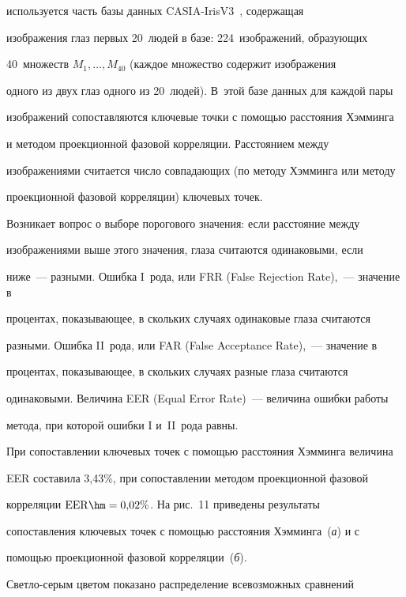 используется часть базы данных CASIA-IrisV3~\cite{12-pav}, содержащая 


изображения глаз первых 20~людей в базе: 224~изображений, образующих 


40~множеств $M_1,\ldots , M_{40}$ (каждое множество содержит изображения 


одного из двух глаз одного из 20~людей). В~этой базе данных для каждой пары 


изображений сопоставляются ключевые точки с помощью расстояния Хэмминга 


и методом проекционной фазовой корреляции. Расстоянием между 


изображениями считается число совпадающих (по методу Хэмминга или методу 


проекционной фазовой корреляции) ключевых точек.





Возникает вопрос о выборе порогового значения: если расстояние между 


изоб\-ра\-же\-ни\-ями выше этого значения, глаза считаются одинаковыми, если 


ниже~--- разными. Ошибка I~рода, или FRR (False Rejection Rate),~--- значение в 


процентах, показывающее, в скольких случаях одинаковые глаза считаются 


разными. Ошибка II~рода, или FAR (False Acceptance Rate),~--- значение в 


процентах, показывающее, в скольких случаях разные глаза считаются 


одинаковыми. Величина EER (Equal Error Rate)~--- величина ошибки работы 


метода, при которой ошибки I и~II~рода равны.





При сопоставлении ключевых точек с помощью расстояния Хэмминга величина 


EER составила 3,43\%, при сопоставлении методом проекционной фазовой 


корреляции $\mathrm{EER}\hm=0{,}02\%$. На рис.~11 приведены результаты 


сопоставления ключевых точек с помощью расстояния Хэмминга~(\textit{а}) и с 


помощью проекционной фазовой корреляции~(\textit{б}). 


Свет\-ло-се\-рым цветом показано распределение всевозможных сравнений 


